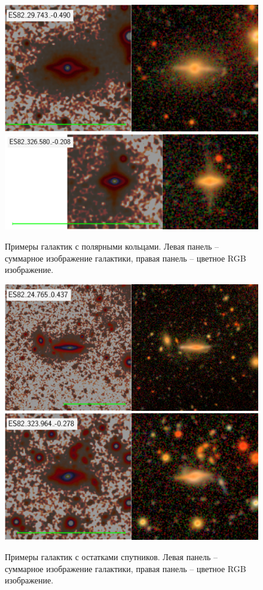 \begin{figure}[ht]

    \includegraphics[height=.14\textheight]{images/307.png}\hfill
    \includegraphics[height=.14\textheight]{images/627.png}\hfill

    \caption{Примеры галактик с полярными кольцами. Левая панель -- суммарное изображение галактики, правая панель -- цветное RGB изображение.}\label{fig:rings}
\end{figure}

\begin{figure}[ht]

    \includegraphics[width=.5\textwidth]{images/270.png}\hfill
    \includegraphics[width=.5\textwidth]{images/602.png}\hfill

    \caption{Примеры галактик с остатками спутников. Левая панель -- суммарное изображение галактики, правая панель -- цветное RGB изображение.}\label{fig:debris}
\end{figure}

